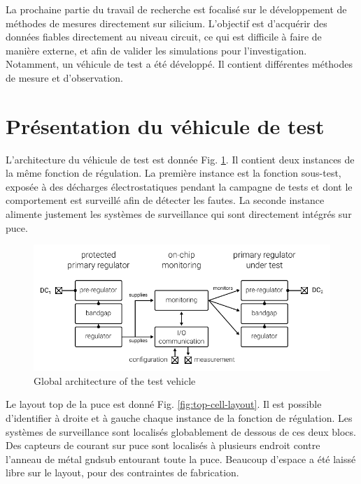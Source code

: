 La prochaine partie du travail de recherche est focalisé sur le développement de méthodes de mesures directement sur silicium.
L'objectif est d'acquérir des données fiables directement au niveau circuit, ce qui est difficile à faire de manière externe, et afin de valider les simulations pour l'investigation.
Notamment, un véhicule de test a été développé.
Il contient différentes méthodes de mesure et d'observation.

\section{Présentation du véhicule de test}

L'architecture du véhicule de test est donnée Fig. \ref{architecture_testchip}.
Il contient deux instances de la même fonction de régulation.
La première instance est la fonction sous-test, exposée à des décharges électrostatiques pendant la campagne de tests et dont le comportement est surveillé afin de détecter les fautes.
La seconde instance alimente justement les systèmes de surveillance qui sont directement intégrés sur puce.

\begin{figure}[h]
  \centering
  \includegraphics{src/1/figures/architecture_testchip.pdf}
  \caption{Global architecture of the test vehicle}
  \label{architecture_testchip}
\end{figure}

Le layout top de la puce est donné Fig. \ref{fig:top-cell-layout}.
Il est possible d'identifier à droite et à gauche chaque instance de la fonction de régulation.
Les systèmes de surveillance sont localisés globablement de dessous de ces deux blocs.
Des capteurs de courant sur puce sont localisés à plusieurs endroit contre l'anneau de métal gndsub entourant toute la puce.
Beaucoup d'espace a été laissé libre sur le layout, pour des contraintes de fabrication.


